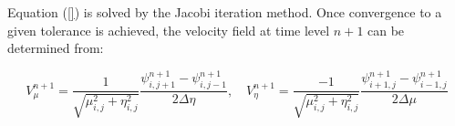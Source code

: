 \documentclass{article}
\begin{document}


Equation (\ref{}) is solved by the Jacobi iteration method. Once convergence to a given tolerance is achieved, the velocity field at time level $n+1$ can be determined from:

\begin{equation}
V_\mu^{n+1}=\frac{1}{\sqrt{\mu_{i,j}^2+\eta_{i,j}^2}} \frac{\psi_{i,j+1}^{n+1} - \psi_{i,j-1}^{n+1}}{2\Delta \eta}, \quad V_\eta^{n+1}=\frac{-1}{\sqrt{\mu_{i,j}^2+\eta_{i,j}^2}} \frac{\psi_{i+1,j}^{n+1} - \psi_{i-1,j}^{n+1}}{2\Delta \mu}
\end{equation}
\end{document}
